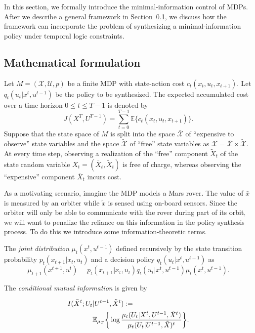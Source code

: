 In this section, we formally introduce the minimal-information control of MDPs.
After we describe a general framework in Section~\ref{secformulation}, we discuss how the framework can incorporate the problem of synthesizing a minimal-information policy under temporal logic constraints.

\subsection{Mathematical formulation}
\label{secformulation}

Let $M=(\mathcal{X}, \mathcal{U}, p)$ be a finite MDP with state-action cost $c_t(x_t, u_t, x_{t+1})$. Let $q_t(u_t|x^t,u^{t-1})$ be the policy to be synthesized. The expected accumulated cost over a time horizon $0\leq t \leq T-1$ is denoted by
\[
J(X^T, U^{T-1})=\sum_{t=0}^{T-1}\mathbb{E}\{c_t(x_t, u_t, x_{t+1})\}.
\]
Suppose that the state space of $M$ is split into the space $\bar{\mathcal{X}}$ of ``expensive to observe'' state variables and the space $\tilde{\mathcal{X}}$ of ``free'' state variables as $\mathcal{X}=\bar{\mathcal{X}}\times \tilde{\mathcal{X}}$.
At every time step, observing a realization of the ``free'' component $\tilde{X}_t$ of the state random variable $X_t=(\bar{X}_t, \tilde{X}_t)$ is free of charge, whereas observing the ``expensive'' component $\bar{X}_t$ incurs cost. 

As a motivating scenario, imagine the MDP models a Mars rover. The value of $\bar{x}$ is measured by an orbiter while $\tilde{x}$ is sensed using on-board sensors. Since the orbiter will only be able to communicate with the rover during part of its orbit, we will want to penalize the reliance on this information in the policy synthesis process. To do this we introduce some information-theoretic terms. 

The \emph{joint distribution} $\mu_{t}(x^{t}, u^{t-1})$ defined recursively by the state transition probability $p_t(x_{t+1}|x_t, u_t)$ and a decision policy $q_t(u_t|x^t, u^{t-1})$ as
\[
\mu_{t+1}(x^{t+1}, u^t)=p_t(x_{t+1}|x_t, u_t)q_t(u_t|x^t, u^{t-1})\mu_t(x^t, u^{t-1}).
\]


 The \emph{conditional mutual information} is given by 

\begin{align*}
I  (\bar{X}^t;U_t & \vert U^{t-1},\tilde{X}^{t}) := \nonumber \\ &\mathbb{E}_{\mu_T}\bigg\{\log\frac{\mu_{t}(U_t|\bar{X}^{t},U^{t-1},\tilde{X}^t)}{\mu_{t}(U_t\vert U^{t-1}, \tilde{X})^t}\bigg\}.
\end{align*}

